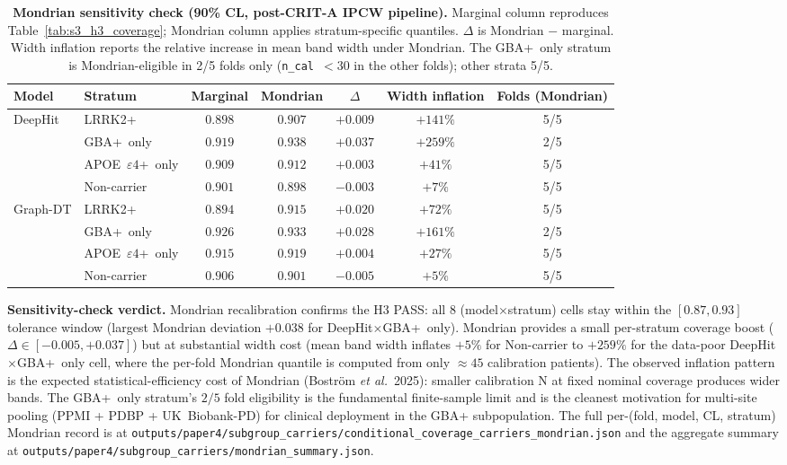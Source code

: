 \documentclass[11pt]{article}
\begin{document}
\begin{table}[h!]
\centering
\caption{\textbf{Mondrian sensitivity check (90\% CL, post-CRIT-A IPCW pipeline).} Marginal column reproduces Table~\ref{tab:s3_h3_coverage}; Mondrian column applies stratum-specific quantiles. $\Delta$ is Mondrian $-$ marginal. Width inflation reports the relative increase in mean band width under Mondrian. The GBA+~only stratum is Mondrian-eligible in 2/5 folds only (\texttt{n\_cal}~$<30$ in the other folds); other strata 5/5.}
\label{tab:s3_h3_mondrian}
\begin{tabular}{llccccc}
\toprule
\textbf{Model} & \textbf{Stratum} & \textbf{Marginal} & \textbf{Mondrian} & \textbf{$\Delta$} & \textbf{Width inflation} & \textbf{Folds (Mondrian)} \\
\midrule
\multirow{4}{*}{DeepHit}
  & LRRK2+                    & $0.898$ & $0.907$ & $+0.009$ & $+141\%$ & 5/5 \\
  & GBA+~only                 & $0.919$ & $0.938$ & $+0.037$ & $+259\%$ & 2/5 \\
  & APOE~$\varepsilon4$+~only & $0.909$ & $0.912$ & $+0.003$ & $+41\%$  & 5/5 \\
  & Non-carrier               & $0.901$ & $0.898$ & $-0.003$ & $+7\%$   & 5/5 \\
\midrule
\multirow{4}{*}{Graph-DT}
  & LRRK2+                    & $0.894$ & $0.915$ & $+0.020$ & $+72\%$  & 5/5 \\
  & GBA+~only                 & $0.926$ & $0.933$ & $+0.028$ & $+161\%$ & 2/5 \\
  & APOE~$\varepsilon4$+~only & $0.915$ & $0.919$ & $+0.004$ & $+27\%$  & 5/5 \\
  & Non-carrier               & $0.906$ & $0.901$ & $-0.005$ & $+5\%$   & 5/5 \\
\bottomrule
\end{tabular}
\end{table}

\noindent\textbf{Sensitivity-check verdict.} Mondrian recalibration confirms the H3 PASS: all 8 (model$\times$stratum) cells stay within the $[0.87, 0.93]$ tolerance window (largest Mondrian deviation $+0.038$ for DeepHit$\times$GBA+~only). Mondrian provides a small per-stratum coverage boost ($\Delta \in [-0.005, +0.037]$) but at substantial width cost (mean band width inflates $+5\%$ for Non-carrier to $+259\%$ for the data-poor DeepHit$\times$GBA+~only cell, where the per-fold Mondrian quantile is computed from only $\approx 45$ calibration patients). The observed inflation pattern is the expected statistical-efficiency cost of Mondrian (Bostr\"om \emph{et al.}~2025): smaller calibration N at fixed nominal coverage produces wider bands. The GBA+~only stratum's $2/5$ fold eligibility is the fundamental finite-sample limit and is the cleanest motivation for multi-site pooling (PPMI + PDBP + UK~Biobank-PD) for clinical deployment in the GBA+ subpopulation. The full per-(fold, model, CL, stratum) Mondrian record is at \texttt{outputs/paper4/subgroup\_carriers/conditional\_coverage\_carriers\_mondrian.json} and the aggregate summary at \texttt{outputs/paper4/subgroup\_carriers/mondrian\_summary.json}.
\end{document}
